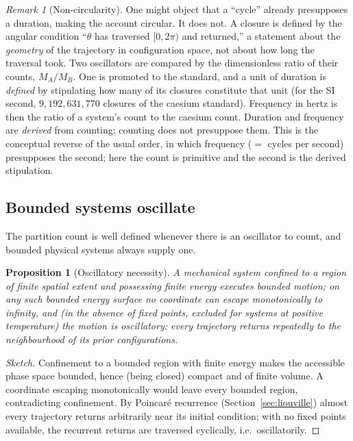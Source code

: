 \documentclass[11pt,a4paper]{article}
\theoremstyle{thmstyle}
\newtheorem{proposition}[theorem]{Proposition}
\theoremstyle{definition}
\theoremstyle{remark}
\newtheorem{remark}[theorem]{Remark}
\newcommand{\Count}{M}
\begin{document}
\begin{remark}[Non-circularity]
\label{rem:noncircular}
One might object that a ``cycle'' already presupposes a duration, making
the account circular. It does not. A closure is defined by the angular
condition ``$\theta$ has traversed $[0,2\pi)$ and returned,'' a statement
about the \emph{geometry} of the trajectory in configuration space, not
about how long the traversal took. Two oscillators are compared by the
dimensionless ratio of their counts, $\Count_{A}/\Count_{B}$. One is
promoted to the standard, and a unit of duration is \emph{defined} by
stipulating how many of its closures constitute that unit (for the SI
second, $9{,}192{,}631{,}770$ closures of the caesium standard).
Frequency in hertz is then the ratio of a system's count to the caesium
count. Duration and frequency are \emph{derived} from counting; counting
does not presuppose them. This is the conceptual reverse of the usual
order, in which frequency ($=$ cycles per second) presupposes the second;
here the count is primitive and the second is the derived stipulation.
\end{remark}

\subsection{Bounded systems oscillate}
\label{sec:bounded}

The partition count is well defined whenever there is an oscillator to
count, and bounded physical systems always supply one.

\begin{proposition}[Oscillatory necessity]
\label{prop:osc}
A mechanical system confined to a region of finite spatial extent and
possessing finite energy executes bounded motion; on any such bounded
energy surface no coordinate can escape monotonically to infinity, and
(in the absence of fixed points, excluded for systems at positive
temperature) the motion is oscillatory: every trajectory returns
repeatedly to the neighbourhood of its prior configurations.
\end{proposition}

\begin{proof}[Sketch]
Confinement to a bounded region with finite energy makes the accessible
phase space bounded, hence (being closed) compact and of finite volume.
A coordinate escaping monotonically would leave every bounded region,
contradicting confinement. By Poincar\'e recurrence
(Section~\ref{sec:liouville}) almost every trajectory returns
arbitrarily near its initial condition; with no fixed points available,
the recurrent returns are traversed cyclically, i.e.\ oscillatorily.
\end{proof}
\end{document}
